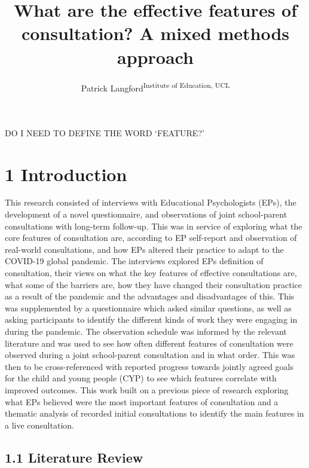 \documentclass[
  english,
  man]{apa7}
\title{What are the effective features of consultation? A mixed methods approach}
\author{Patrick Langford\textsuperscript{Institute of Education, UCL}}
\date{}
\affiliation{\phantom{0}}
\begin{document}
\maketitle

DO I NEED TO DEFINE THE WORD `FEATURE?'

\hypertarget{introduction}{%
\section{1 Introduction}\label{introduction}}

This research consisted of interviews with Educational Psychologists (EPs), the development of a novel questionnaire, and observations of joint school-parent consultations with long-term follow-up. This was in service of exploring what the core features of consultation are, according to EP self-report and observation of real-world consultations, and how EPs altered their practice to adapt to the COVID-19 global pandemic. The interviews explored EPs definition of consultation, their views on what the key features of effective consultations are, what some of the barriers are, how they have changed their consultation practice as a result of the pandemic and the advantages and disadvantages of this. This was supplemented by a questionnaire which asked similar questions, as well as asking participants to identify the different kinds of work they were engaging in during the pandemic. The observation schedule was informed by the relevant literature and was used to see how often different features of consultation were observed during a joint school-parent consultation and in what order. This was then to be cross-referenced with reported progress towards jointly agreed goals for the child and young people (CYP) to see which features correlate with improved outcomes. This work built on a previous piece of research exploring what EPs believed were the most important features of consultation and a thematic analysis of recorded initial consultations to identify the main features in a live consultation.

\hypertarget{literature-review}{%
\subsection{1.1 Literature Review}\label{literature-review}}
\end{document}
